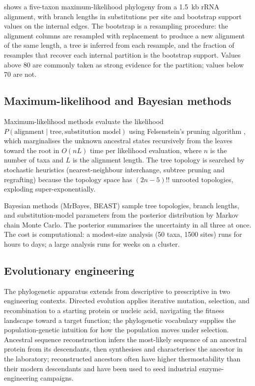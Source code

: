  shows a five-taxon maximum-likelihood
phylogeny from a 1.5~kb rRNA alignment, with branch lengths in
substitutions per site and bootstrap support values on the internal
edges. The bootstrap is a resampling procedure: the alignment columns
are resampled with replacement to produce a new alignment of the same
length, a tree is inferred from each resample, and the fraction of
resamples that recover each internal partition is the bootstrap
support. Values above 80 are commonly taken as strong evidence for the
partition; values below 70 are not.



\subsection{Maximum-likelihood and Bayesian methods}

Maximum-likelihood methods evaluate the likelihood
$P(\text{alignment} \mid \text{tree}, \text{substitution model})$ using
Felsenstein's pruning algorithm \cite{paper:v6c11-felsenstein-phylogeny-1981},
which marginalises the unknown ancestral states recursively from the
leaves toward the root in $O(n L)$ time per likelihood evaluation,
where $n$ is the number of taxa and $L$ is the alignment length. The
tree topology is searched by stochastic heuristics (nearest-neighbour
interchange, subtree pruning and regrafting) because the topology
space has $(2n-5)!!$ unrooted topologies, exploding super-exponentially.

Bayesian methods (MrBayes, BEAST) sample tree topologies, branch
lengths, and substitution-model parameters from the posterior
distribution by Markov chain Monte Carlo. The posterior summarises the
uncertainty in all three at once. The cost is computational: a
modest-size analysis (50 taxa, 1500 sites) runs for hours to days; a
large analysis runs for weeks on a cluster.

\subsection{Evolutionary engineering}

The phylogenetic apparatus extends from descriptive to prescriptive
in two engineering contexts. Directed evolution applies iterative
mutation, selection, and recombination to a starting protein or
nucleic acid, navigating the fitness landscape toward a target
function; the phylogenetic vocabulary supplies the population-genetic
intuition for how the population moves under selection. Ancestral
sequence reconstruction infers the most-likely sequence of an
ancestral protein from its descendants, then synthesises and
characterises the ancestor in the laboratory; reconstructed ancestors
often have higher thermostability than their modern descendants and
have been used to seed industrial enzyme-engineering campaigns.

